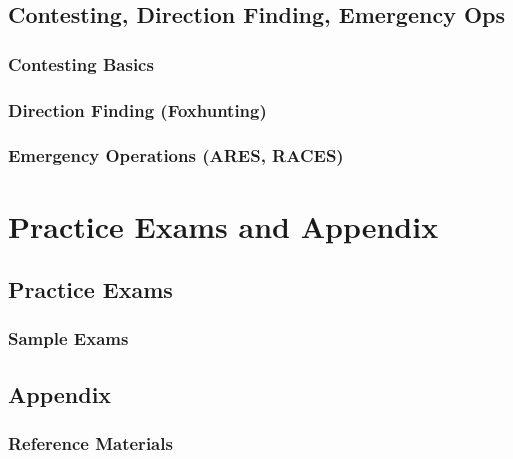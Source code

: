 \documentclass[12pt]{book}
\begin{document}
\chapter{Contesting, Direction Finding, Emergency Ops}
\section{Contesting Basics}

\section{Direction Finding (Foxhunting)}

\section{Emergency Operations (ARES, RACES)}

\part{Practice Exams and Appendix}
\chapter{Practice Exams}
\section{Sample Exams}

\chapter{Appendix}
\section{Reference Materials}


\end{document}
